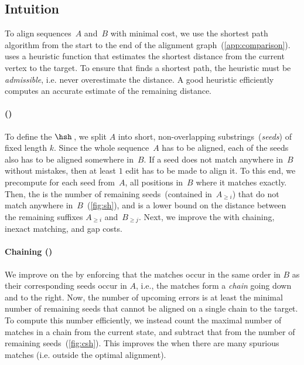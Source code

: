 \subsection{Intuition} \label{sec:intuition}

To align sequences~$A$ and~$B$ with minimal cost, we use the \A shortest path
algorithm from the start to the end of the alignment
graph~(\cref{app:comparison}). \A uses a heuristic function that estimates the
shortest distance from the current vertex to the target. To ensure that \A finds a
shortest path, the heuristic must be \emph{admissible}, i.e. never overestimate
the distance. A good heuristic efficiently computes an accurate estimate of
the remaining distance.

\paragraph{\Sh (\SH)} To define the \emph{\sh} $\hsh$\,, we split $A$ into short,
non-overlapping substrings~(\emph{seeds}) of fixed length $k$. Since the whole
sequence~$A$ has to be aligned, each of the seeds also has to be aligned
somewhere in~$B$. If a seed does not match anywhere in~$B$ without mistakes,
then at least $1$ edit has to be made to align it. To this end, we precompute
for each seed from~$A$, all positions in~$B$ where it matches exactly. Then, the
\SH is the number of remaining seeds~(contained in~$A_{\geq i}$) that do not
match anywhere in~$B$~(\cref{fig:sh}), and is a lower bound on the distance
between the remaining suffixes $A_{\geq i}$ and~$B_{\geq j}$. Next, we improve
the \sh with chaining, inexact matching, and gap costs.

\paragraph{Chaining (\CSH)} We improve on the \SH by enforcing that the matches
occur in the same order in $B$ as their corresponding seeds occur in $A$, i.e.,
the matches form a \emph{chain} going down and to the right. Now, the number of
upcoming errors is at least the minimal number of remaining seeds that cannot be
aligned on a single chain to the target. To compute this number efficiently, we
instead count the maximal number of matches in a chain from the current state,
and subtract that from the number of remaining seeds~(\cref{fig:csh}). This
improves the \sh when there are many spurious matches (i.e. outside the optimal
alignment).

